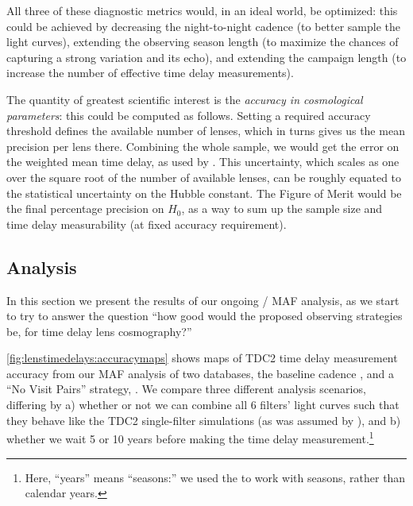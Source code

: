 All three of these diagnostic metrics would, in an ideal world, be
optimized: this could be achieved by decreasing the night-to-night
cadence (to better sample the light curves), extending the observing
season length (to maximize the chances of capturing a strong variation
and its echo), and extending the campaign length (to increase the number
of effective time delay measurements).

The quantity of greatest scientific interest is the {\it accuracy in
cosmological parameters}: this could be computed as follows. Setting a
required accuracy threshold  defines the available number of lenses,
which in turns gives us the mean precision per lens there. Combining the
whole sample, we would get the error on the weighted mean time delay, as
used by \citet{Coe+Moustakas2009}. This uncertainty, which scales as one
over the square root of the number of available lenses,  can be roughly
equated to the statistical uncertainty on the Hubble constant. The
Figure of Merit would be the final percentage precision on $H_0$, as a
way to sum up the sample size and time delay measurability (at fixed
accuracy requirement).


\subsection{\OpSim Analysis}
\label{sec:\secname:analysis}


In this section we present the results of our ongoing \OpSim / MAF
analysis, as we start to try to
answer the question ``how good would the proposed observing
strategies be, for time delay lens cosmography?''

\autoref{fig:lenstimedelays:accuracymaps} shows maps of TDC2 time delay
measurement accuracy from our MAF analysis of two \OpSim databases, the
baseline cadence , and a ``No Visit Pairs''
strategy, . We compare three different
analysis scenarios, differing by a) whether or not we can combine all 6
filters' light curves such that they behave like the TDC2 single-filter
simulations (as was assumed by \citeauthor{LiaoEtal2015}), and b)
whether we wait 5 or 10 years before making the time delay measurement.\footnote{Here, ``years'' means ``seasons:'' we used the
 to work
with seasons, rather than calendar years.}


